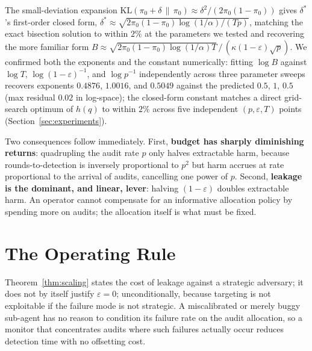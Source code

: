\documentclass[sigconf,anonymous]{aamas}
\theoremstyle{plain}
\theoremstyle{definition}
\begin{document}
The small-deviation expansion $\mathrm{KL}(\pi_0+\delta\,\|\,\pi_0) \approx
\delta^2/(2\pi_0(1-\pi_0))$ gives $\delta^*$'s first-order closed form,
$\delta^* \approx \sqrt{2\pi_0(1-\pi_0)\log(1/\alpha)/(Tp)}$, matching the
exact bisection solution to within $2\%$ at the parameters we tested and
recovering the more familiar form
$B \approx \sqrt{2\pi_0(1-\pi_0)\log(1/\alpha)T}\,/\,(\kappa(1-\varepsilon)\sqrt{p})$.
We confirmed both the exponents and the constant numerically: fitting
$\log B$ against $\log T$, $\log(1-\varepsilon)^{-1}$, and $\log p^{-1}$
independently across three parameter sweeps recovers exponents $0.4876$,
$1.0016$, and $0.5049$ against the predicted $0.5$, $1$, $0.5$ (max residual
$0.02$ in log-space); the closed-form constant matches a direct grid-search
optimum of $h(q)$ to within $2\%$ across five independent
$(p,\varepsilon,T)$ points (Section~\ref{sec:experiments}).

Two consequences follow immediately. First, \textbf{budget has sharply
diminishing returns}: quadrupling the audit rate $p$ only halves extractable
harm, because rounds-to-detection is inversely proportional to $p^2$ but
harm accrues at rate proportional to the arrival of audits, cancelling one
power of $p$. Second, \textbf{leakage is the dominant, and linear, lever}:
halving $(1-\varepsilon)$ doubles extractable harm. An operator cannot
compensate for an informative allocation policy by spending more on audits;
the allocation itself is what must be fixed.

\section{The Operating Rule}
\label{sec:algorithm}

Theorem~\ref{thm:scaling} states the cost of leakage against a strategic
adversary; it does not by itself justify $\varepsilon=0$; unconditionally,
because targeting is not exploitable if the failure mode is not strategic. A
miscalibrated or merely buggy sub-agent has no reason to condition its
failure rate on the audit allocation, so a monitor that concentrates audits
where such failures actually occur reduces detection time with no offsetting
cost.
\end{document}
